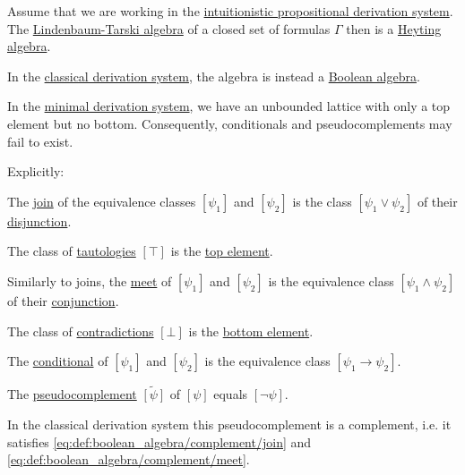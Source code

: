\begin{proposition}\label{thm:intuitionistic_lindenbaum_tarski_algebra}
  Assume that we are working in the \hyperref[def:intuitionistic_propositional_derivation_system]{intuitionistic propositional derivation system}. The \hyperref[def:lindenbaum_tarski_algebra]{Lindenbaum-Tarski algebra} of a closed set of formulas \( \Gamma \) then is a \hyperref[def:heyting_algebra]{Heyting algebra}.

  In the \hyperref[def:propositional_derivation_system]{classical derivation system}, the algebra is instead a \hyperref[def:boolean_algebra]{Boolean algebra}.

  In the \hyperref[def:minimal_propositional_derivation_system]{minimal derivation system}, we have an unbounded lattice with only a top element but no bottom. Consequently, conditionals and pseudocomplements may fail to exist.

  Explicitly:
  \begin{thmenum}
     The \hyperref[def:semilattice/join]{join} of the equivalence classes \( [\psi_1] \) and \( [\psi_2] \) is the class \( [\psi_1 \vee \psi_2] \) of their \hyperref[def:propositional_language/connectives/disjunction]{disjunction}.

     The class of \hyperref[def:propositional_semantics/tautology]{tautologies} \( [\top] \) is the \hyperref[def:poset_extremal_points/top_and_bottom]{top element}.

     Similarly to joins, the \hyperref[def:semilattice/meet]{meet} of \( [\psi_1] \) and \( [\psi_2] \) is the equivalence class \( [\psi_1 \wedge \psi_2] \) of their \hyperref[def:propositional_language/connectives/conjunction]{conjunction}.

     The class of \hyperref[def:propositional_semantics/contradiction]{contradictions} \( [\bot] \) is the \hyperref[def:poset_extremal_points/top_and_bottom]{bottom element}.

     The \hyperref[eq:def:heyting_algebra/conditional]{conditional} of \( [\psi_1] \) and \( [\psi_2] \) is the equivalence class \( [\psi_1 \rightarrow \psi_2] \).

     The \hyperref[eq:def:heyting_algebra/pseudocomplement]{pseudocomplement} \( \widetilde{[\psi]} \) of \( [\psi] \) equals \( [\neg \psi] \).

    In the classical derivation system this pseudocomplement is a complement, i.e. it satisfies \eqref{eq:def:boolean_algebra/complement/join} and \eqref{eq:def:boolean_algebra/complement/meet}.
  \end{thmenum}
\end{proposition}
